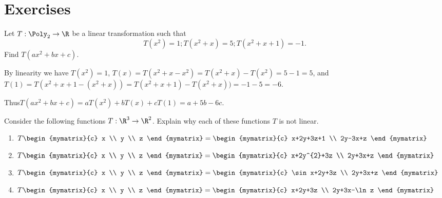 \section*{Exercises}


\begin{ex}
Let $T:\Poly_2 \to \R$ be a linear transformation such that
\[ T(x^2)=1; T(x^2+x)=5; T(x^2+x+1)=-1.\]
Find $T(ax^2+bx+c)$.
\begin{sol}
By linearity we have
$T(x^2)=1$, $T(x) = T(x^2+x - x^2)= T(x^2+x) - T(x^2)= 5-1=5$, and
$T(1) = T(x^2+x+1 -(x^2+x))=T(x^2+x+1) -T(x^2+x))= -1-5=-6$.

Thus$T(ax^2+bx+c) = aT(x^2) + bT(x) + cT(1) = a+5b-6c$.
\end{sol}
\end{ex}

\begin{ex} Consider the following functions $T:\R^{3}\rightarrow \R^{2}$.
Explain why each of these functions $T$ is not linear.

\begin{enumerate}
\item $T\begin{mymatrix}{c}
x \\
y \\
z
\end{mymatrix} =\begin{mymatrix}{c}
x+2y+3z+1 \\
2y-3x+z
\end{mymatrix} $

\item $T\begin{mymatrix}{c}
x \\
y \\
z
\end{mymatrix} =\begin{mymatrix}{c}
x+2y^{2}+3z \\
2y+3x+z
\end{mymatrix} $

\item $T\begin{mymatrix}{c}
x \\
y \\
z
\end{mymatrix} =\begin{mymatrix}{c}
\sin x+2y+3z \\
2y+3x+z
\end{mymatrix} $

\item $T\begin{mymatrix}{c}
x \\
y \\
z
\end{mymatrix} =\begin{mymatrix}{c}
x+2y+3z \\
2y+3x-\ln z
\end{mymatrix} $
\end{enumerate}
\end{ex}


